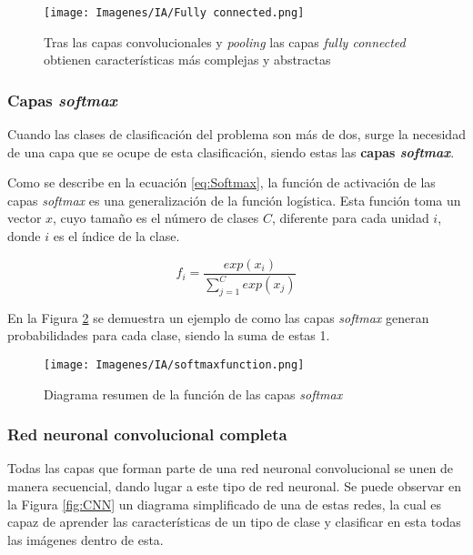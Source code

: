 \documentclass{report}
\begin{document}
\vspace{0.4cm}
\begin{figure}[H]
    \centering
    \texttt{[image: Imagenes/IA/Fully connected.png]}
    \caption{ Tras las capas convolucionales y \textit{pooling} las capas \textit{fully connected} obtienen características más complejas y abstractas \cite{BuenArticuloConvolucion}}
    \label{fig:FullyConnected}
\end{figure}



\subsubsection{Capas \textit{softmax}}


Cuando las clases de clasificación del problema son más de dos, surge la necesidad de una capa que se ocupe de esta clasificación, siendo estas las \textbf{capas \textit{softmax}}. 

Como se describe en la ecuación \ref{eq:Softmax}, la función de activación de las capas \textit{softmax} es una generalización de la función logística. Esta función toma un vector $x$, cuyo tamaño es el número de clases $C$, diferente para cada unidad $i$, donde $i$ es el índice de la clase.



\begin{equation}
    f_{i} = \frac{exp(x_{i})}{\sum^{C}_{j=1} exp(x_{j})}
    \label{eq:Softmax}
\end{equation}


En la Figura \ref{fig:Softmax} se demuestra un ejemplo de como las capas \textit{softmax} generan probabilidades para cada clase, siendo la suma de estas 1.

\vspace{0.4cm}
\begin{figure}[H]
    \centering
    \texttt{[image: Imagenes/IA/softmaxfunction.png]}
    \caption{ Diagrama resumen de la función de las capas \textit{softmax} \cite{BuenArticuloSoftMax}}
    \label{fig:Softmax}
\end{figure}





\subsubsection{Red neuronal convolucional completa}


Todas las capas que forman parte de una red neuronal convolucional se unen de manera secuencial, dando lugar a este tipo de red neuronal. Se puede observar en la Figura \ref{fig:CNN} un diagrama simplificado de una de estas redes, la cual es capaz de aprender las características de un tipo de clase y clasificar en esta todas las imágenes dentro de esta.
\end{document}
